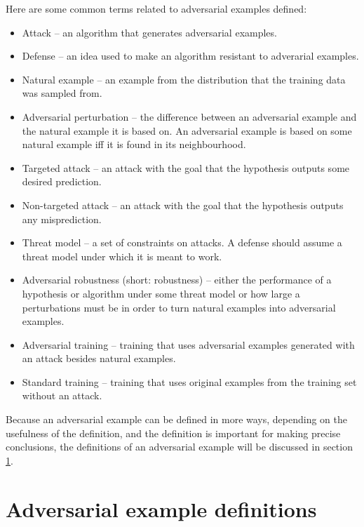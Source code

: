 \documentclass[oneside]{book}
\begin{document}
Here are some common terms related to adversarial examples defined:
\begin{itemize}
	\item Attack -- an algorithm that generates adversarial examples.
	\item Defense -- an idea used to make an algorithm resistant to adverarial examples.
	\item Natural example -- an example from the distribution that the training data was sampled from.
	\item Adversarial perturbation -- the difference between an adversarial example and the natural example it is based on. An adversarial example is based on some natural example iff it is found in its neighbourhood.
	\item Targeted attack -- an attack with the goal that the hypothesis outputs some desired prediction.
	\item Non-targeted attack -- an attack with the goal that the hypothesis outputs any misprediction.
	\item Threat model -- a set of constraints on attacks. A defense should assume a threat model under which it is meant to work.
	\item Adversarial robustness (short: robustness) -- either the performance of a hypothesis or algorithm under some threat model or how large a perturbations must be in order to turn natural examples into adversarial examples.
	\item Adversarial training -- training that uses adversarial examples generated with an attack besides natural examples.
	\item Standard training -- training that uses original examples from the training set without an attack.
\end{itemize}
Because an adversarial example can be defined in more ways, depending on the usefulness of the definition, and the definition is important for making precise conclusions, the definitions of an adversarial example will be discussed in section \ref{sec:adversarial-example-definitions}.


\section{Adversarial example definitions} \label{sec:adversarial-example-definitions}
\end{document}
